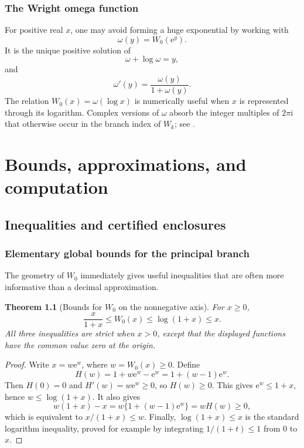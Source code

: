 \documentclass[11pt,openany]{book}
\newcommand{\e}{\mathrm{e}}
\newcommand{\ii}{\mathrm{i}}
\theoremstyle{plain}
\newtheorem{theorem}{Theorem}[chapter]
\theoremstyle{definition}
\theoremstyle{remark}
\begin{document}
\section{The Wright omega function}
For positive real \(x\), one may avoid forming a huge exponential by working
with
\[
          \omega(y)=W_0(\e^y).
\]
It is the unique positive solution of
\begin{equation}\label{eq:omegaeq}
          \omega+\log\omega=y,
\end{equation}
and
\[
          \omega'(y)=\frac{\omega(y)}{1+\omega(y)}.
\]
The relation \(W_0(x)=\omega(\log x)\) is numerically useful when \(x\) is
represented through its logarithm.  Complex versions of \(\omega\) absorb the
integer multiples of \(2\pi\ii\) that otherwise occur in the branch index of
\(W_k\); see \cite{DLMF,Corless1996}.

\part{Bounds, approximations, and computation}

\chapter{Inequalities and certified enclosures}\label{chap:bounds}

\section{Elementary global bounds for the principal branch}
The geometry of \(W_0\) immediately gives useful inequalities that are often
more informative than a decimal approximation.

\begin{theorem}[Bounds for \(W_0\) on the nonnegative axis]
For \(x\ge0\),
\begin{equation}\label{eq:w0positivebounds}
       \frac{x}{1+x}\le W_0(x)\le\log(1+x)\le x.
\end{equation}
All three inequalities are strict when \(x>0\), except that the displayed
functions have the common value zero at the origin.
\end{theorem}

\begin{proof}
Write \(x=w\e^w\), where \(w=W_0(x)\ge0\).  Define
\[
 H(w)=1+w\e^w-\e^w=1+(w-1)\e^w.
\]
Then \(H(0)=0\) and \(H'(w)=w\e^w\ge0\), so \(H(w)\ge0\).  This gives
\(\e^w\le1+x\), hence \(w\le\log(1+x)\).  It also gives
\[
 w(1+x)-x
 =w\{1+(w-1)\e^w\}=wH(w)\ge0,
\]
which is equivalent to \(x/(1+x)\le w\).  Finally,
\(\log(1+x)\le x\) is the standard logarithm inequality, proved for example
by integrating \(1/(1+t)\le1\) from \(0\) to \(x\).
\end{proof}
\end{document}
